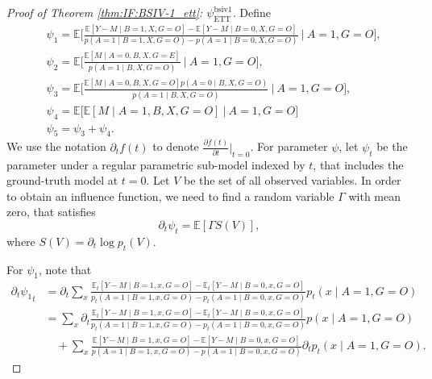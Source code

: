 \documentclass[10pt]{article}
\newcommand{\E}{\mathbb{E}}
\begin{document}
\begin{proof}[Proof of Theorem \ref{thm:IF:BSIV-1_ett}: $\psi_{\text{ETT}}^{\text{bsiv1}}$]
	
Define
\begin{align*}
&\psi_1=
\E\big[\frac{\E[Y-M\mid B=1,X,G=O]-\E[Y-M\mid B=0,X,G=O]}{p(A=1\mid B=1,X,G=O)-p(A=1\mid B=0,X,G=O)}~\big|~ A=1,G=O\big],\\
&\psi_2=
\E\big[\frac{\E[M\mid A=0,B,X,G=E]}{p(A=1\mid B,X,G=O)}~\big|~ A=1,G=O\big],\\
&\psi_3=
\E\big[\frac{\E[M\mid A=0,B,X,G=O]p(A=0\mid B,X,G=O)}{p(A=1\mid B,X,G=O)}~\big|~ A=1,G=O\big],\\
&\psi_4=
\E\big[\E[M\mid A=1,B,X,G=O]~\big|~ A=1,G=O\big]\\
&\psi_5=\psi_3+\psi_4.
\end{align*}
We use the notation $\partial_tf(t)$ to denote $\frac{\partial f(t)}{\partial t}\big|_{t=0}$.
For parameter $\psi$, let $\psi_t$ be the parameter under a regular parametric sub-model indexed by $t$, that includes the ground-truth model at $t=0$.
Let $V$ be the set of all observed variables.
In order to obtain an influence function, we need to find a random variable $\Gamma$ with mean zero, that satisfies
\[
\partial_t\psi_t=\E[\Gamma S(V)],
\]
where $S(V)=\partial_t\log p_t(V)$.	

For $\psi_1$, note that
\begin{equation}
\label{eq:IF-BSIV-1-1}
\begin{aligned}
\partial_t{\psi_1}_t	
&=\partial_t\sum_x\frac{\E_t[Y-M\mid B=1,x,G=O]-\E_t[Y-M\mid B=0,x,G=O]}{p_t(A=1\mid B=1,x,G=O)-p_t(A=1\mid B=0,x,G=O)}p_t(x\mid A=1,G=O)\\
&=\sum_x\partial_t\frac{\E_t[Y-M\mid B=1,x,G=O]-\E_t[Y-M\mid B=0,x,G=O]}{p_t(A=1\mid B=1,x,G=O)-p_t(A=1\mid B=0,x,G=O)}p(x\mid A=1,G=O)\\
&\quad+\sum_x\frac{\E[Y-M\mid B=1,x,G=O]-\E[Y-M\mid B=0,x,G=O]}{p(A=1\mid B=1,x,G=O)-p(A=1\mid B=0,x,G=O)}\partial_tp_t(x\mid A=1,G=O).
\end{aligned}
\end{equation}


\end{proof}
\end{document}
